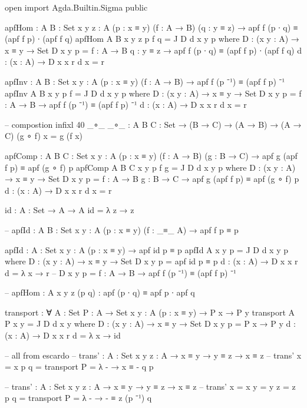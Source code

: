 \documentclass[11pt, a4paper]{article}
\begin{document}
\begin{code}

  open import Agda.Builtin.Sigma public

  apfHom : {A B : Set} {x y z : A} (p : x ≡ y) (f : A → B) (q : y ≡ z) → apf f (p ∙ q) ≡ (apf f p) ∙ (apf f q)
  apfHom {A} {B} {x} {y} {z} p f q = J D d x y p
    where
      D : (x y : A) → x ≡ y → Set
      D x y p = {f : A → B} {q : y ≡ z} → apf f (p ∙ q) ≡ (apf f p) ∙ (apf f q)
      d : (x : A) → D x x r
      d x = r

  apfInv : {A B : Set} {x y : A} (p : x ≡ y) (f : A → B) → apf f (p ⁻¹) ≡ (apf f p) ⁻¹
  apfInv {A} {B} {x} {y} p f = J D d x y p
    where
      D : (x y : A) → x ≡ y → Set
      D x y p = {f : A → B} → apf f (p ⁻¹) ≡ (apf f p) ⁻¹
      d : (x : A) → D x x r
      d x = r

  -- compostion
  infixl 40 _∘_
  _∘_ : {A B C : Set} → (B → C) → (A → B) → (A → C)
  (g ∘ f) x = g (f x)

  apfComp : {A B C : Set} {x y : A} (p : x ≡ y) (f : A → B) (g : B → C) → apf g (apf f p) ≡ apf (g ∘ f) p
  apfComp {A} {B} {C} {x} {y} p f g = J D d x y p
    where
      D : (x y : A) → x ≡ y → Set
      D x y p = {f : A → B} {g : B → C} → apf g (apf f p) ≡ apf (g ∘ f) p
      d : (x : A) → D x x r
      d x = r

  id : {A : Set} → A → A
  id = λ z → z

  -- apfId : {A B : Set} {x y : A} (p : x ≡ y) (f : _≡_ {A}) → apf f p ≡ p

  apfId : {A : Set} {x y : A} (p : x ≡ y) → apf id p ≡ p
  apfId {A} {x} {y} p = J D d x y p
    where
      D : (x y : A) → x ≡ y → Set
      D x y p = apf id p ≡ p
      d : (x : A) → D x x r
      d = λ x → r 
  --     D x y p = {f : A → B} → apf f (p ⁻¹) ≡ (apf f p) ⁻¹

  -- apfHom : {A} {x y z} (p q) : apf (p ∙ q) ≡ apf p ∙ apf q


  transport : ∀ {A : Set} {P : A → Set} {x y : A} (p : x ≡ y)  → P x → P y
  transport {A} {P} {x} {y} = J D d x y
    where
      D : (x y : A) → x ≡ y → Set
      D x y p =  P x → P y
      d : (x : A) → D x x r
      d = λ x → id

  -- all from escardo
  -- trans' : {A : Set} {x y z : A} → x ≡ y → y ≡ z → x ≡ z
  -- trans' {x = x} p q = transport {P = λ - → x ≡ - } q p 

  -- trans' : {A : Set} {x y z : A} → x ≡ y → y ≡ z → x ≡ z
  -- trans' {x = x} {y = y} {z = z} p q = transport {P = λ - → - ≡ z } (p ⁻¹) q 


\end{code}
\end{document}
